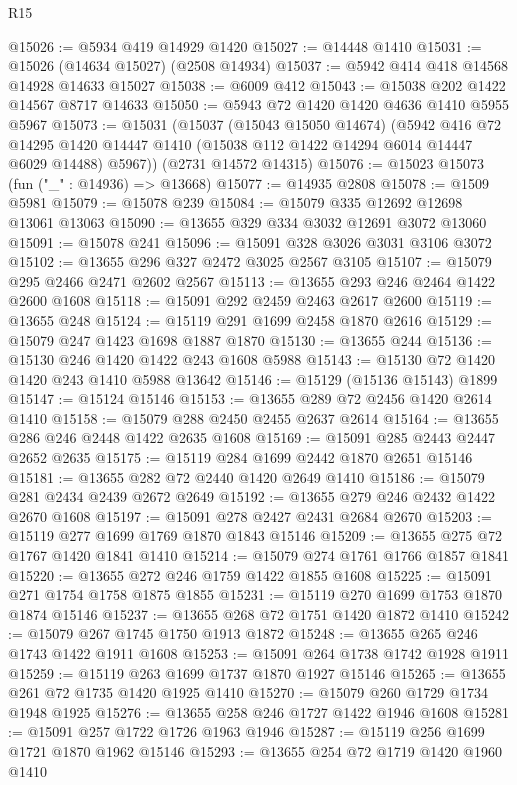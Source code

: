 \begin{lexlean}{R15}
\begin{coremodule}
@15026 := @5934 @419 @14929 @1420
@15027 := @14448 @1410
@15031 := @15026 (@14634 @15027) (@2508 @14934)
@15037 := @5942 @414 @418 @14568 @14928 @14633 @15027
@15038 := @6009 @412
@15043 := @15038 @202 @1422 @14567 @8717 @14633
@15050 := @5943 @72 @1420 @1420 @4636 @1410 @5955 @5967
@15073 := @15031
    (@15037
      (@15043 @15050 @14674)
      (@5942
        @416
        @72
        @14295
        @1420
        @14447
        @1410
        (@15038 @112 @1422 @14294 @6014 @14447 @6029 @14488)
        @5967))
    (@2731 @14572 @14315)
@15076 := @15023 @15073 (fun ("_" : @14936) => @13668)
@15077 := @14935 @2808
@15078 := @1509 @5981
@15079 := @15078 @239
@15084 := @15079 @335 @12692 @12698 @13061 @13063
@15090 := @13655 @329 @334 @3032 @12691 @3072 @13060
@15091 := @15078 @241
@15096 := @15091 @328 @3026 @3031 @3106 @3072
@15102 := @13655 @296 @327 @2472 @3025 @2567 @3105
@15107 := @15079 @295 @2466 @2471 @2602 @2567
@15113 := @13655 @293 @246 @2464 @1422 @2600 @1608
@15118 := @15091 @292 @2459 @2463 @2617 @2600
@15119 := @13655 @248
@15124 := @15119 @291 @1699 @2458 @1870 @2616
@15129 := @15079 @247 @1423 @1698 @1887 @1870
@15130 := @13655 @244
@15136 := @15130 @246 @1420 @1422 @243 @1608 @5988
@15143 := @15130 @72 @1420 @1420 @243 @1410 @5988 @13642
@15146 := @15129 (@15136 @15143) @1899
@15147 := @15124 @15146
@15153 := @13655 @289 @72 @2456 @1420 @2614 @1410
@15158 := @15079 @288 @2450 @2455 @2637 @2614
@15164 := @13655 @286 @246 @2448 @1422 @2635 @1608
@15169 := @15091 @285 @2443 @2447 @2652 @2635
@15175 := @15119 @284 @1699 @2442 @1870 @2651 @15146
@15181 := @13655 @282 @72 @2440 @1420 @2649 @1410
@15186 := @15079 @281 @2434 @2439 @2672 @2649
@15192 := @13655 @279 @246 @2432 @1422 @2670 @1608
@15197 := @15091 @278 @2427 @2431 @2684 @2670
@15203 := @15119 @277 @1699 @1769 @1870 @1843 @15146
@15209 := @13655 @275 @72 @1767 @1420 @1841 @1410
@15214 := @15079 @274 @1761 @1766 @1857 @1841
@15220 := @13655 @272 @246 @1759 @1422 @1855 @1608
@15225 := @15091 @271 @1754 @1758 @1875 @1855
@15231 := @15119 @270 @1699 @1753 @1870 @1874 @15146
@15237 := @13655 @268 @72 @1751 @1420 @1872 @1410
@15242 := @15079 @267 @1745 @1750 @1913 @1872
@15248 := @13655 @265 @246 @1743 @1422 @1911 @1608
@15253 := @15091 @264 @1738 @1742 @1928 @1911
@15259 := @15119 @263 @1699 @1737 @1870 @1927 @15146
@15265 := @13655 @261 @72 @1735 @1420 @1925 @1410
@15270 := @15079 @260 @1729 @1734 @1948 @1925
@15276 := @13655 @258 @246 @1727 @1422 @1946 @1608
@15281 := @15091 @257 @1722 @1726 @1963 @1946
@15287 := @15119 @256 @1699 @1721 @1870 @1962 @15146
@15293 := @13655 @254 @72 @1719 @1420 @1960 @1410

\end{coremodule}
\end{lexlean}
